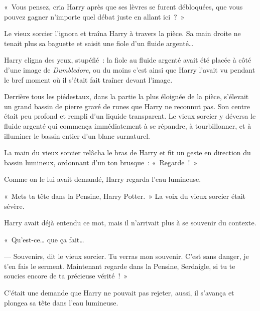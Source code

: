 «~Vous pensez, cria Harry après que ses lèvres se furent débloquées, que vous pouvez gagner n'importe quel débat juste en allant ici~?~»

Le vieux sorcier l'ignora et traîna Harry à travers la pièce.
Sa main droite ne tenait plus sa baguette et saisit une fiole d'un fluide argenté…

Harry cligna des yeux, stupéfié~: la fiole au fluide argenté avait été placée à côté d'une image de \emph{Dumbledore}, ou du moins c'est ainsi que Harry l'avait vu pendant le bref moment où il s'était fait traîner devant l'image.

Derrière tous les piédestaux, dans la partie la plus éloignée de la pièce, s'élevait un grand bassin de pierre gravé de runes que Harry ne reconnut pas.
Son centre était peu profond et rempli d'un liquide transparent.
Le vieux sorcier y déversa le fluide argenté qui commença immédiatement à se répandre, à tourbillonner, et à illuminer le bassin entier d'un blanc surnaturel.

La main du vieux sorcier relâcha le bras de Harry et fit un geste en direction du bassin lumineux, ordonnant d'un ton brusque~: «~Regarde~!~»

Comme on le lui avait demandé, Harry regarda l'eau lumineuse.

«~Mets ta tête dans la Pensine, Harry Potter.~»
La voix du vieux sorcier était sévère.

Harry avait déjà entendu ce mot, mais il n'arrivait plus à se souvenir du contexte.

«~Qu'est-ce… que ça fait…

--- Souvenirs, dit le vieux sorcier.
Tu verras mon souvenir.
C'est sans danger, je t'en fais le serment.
Maintenant regarde dans la Pensine, Serdaigle, si tu te soucies encore de ta précieuse vérité~!~»

C'était une demande que Harry ne pouvait pas rejeter, aussi, il s'avança et plongea sa tête dans l'eau lumineuse.
\later

